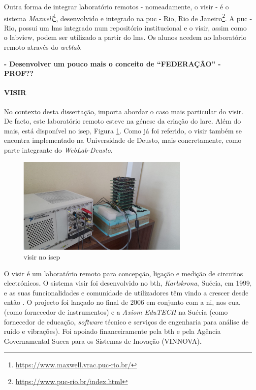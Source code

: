 Outra forma de integrar \acrshort{laboratório remoto}s - nomeadamente, o \acrshort{visir} - é o sistema \textit{Maxwell}\footnote{\url{https://www.maxwell.vrac.puc-rio.br/}}, desenvolvido e integrado na \acrfull{puc} - Rio, Rio de Janeiro\footnote{\url{https://www.puc-rio.br/index.html}}. A \acrshort{puc} - Rio, possui um \acrshort{lms} integrado num repositório institucional e o \acrshort{visir}, assim como o \acrshort{labview}, podem ser utilizado a partir do \acrshort{lms}. Os alunos acedem ao \acrshort{laboratório remoto} através do \textit{weblab}\cite{Alves}.

\textbf{- Desenvolver um pouco mais o conceito de ``FEDERAÇÃO'' - PROF??}

\paragraph{VISIR}
\label{sec:visir}
No contexto desta dissertação, importa abordar o caso mais particular do \acrshort{visir}. De facto, este \acrshort{laboratório remoto} esteve na génese da criação do \acrshort{lare}. Além do mais, está disponível no \acrshort{isep}, Figura \ref{fig:visirISEP}. Como já foi referido, o \acrshort{visir} também se encontra implementado na Universidade de Deusto, mais concretamente, como parte integrante do \textit{WebLab-Deusto}.

\begin{figure}[hbtp]
    \centering
    \includegraphics[width=0.75\textwidth]{figures/visirISEP.jpeg}
    \caption{\acrshort{visir} no \acrshort{isep}}
    \label{fig:visirISEP}
\end{figure}

O \acrshort{visir} é um \acrshort{laboratório remoto} para concepção, ligação e medição de circuitos electrónicos. O sistema \acrshort{visir} foi desenvolvido no \acrfull{bth}, \textit{Karlskrona}, Suécia, em 1999, e as suas funcionalidades e comunidade de utilizadores têm vindo a crescer desde então \cite{RemoteLabsImpactVISIR}. O projecto foi lançado no final de 2006 em conjunto com a \acrshort{ni}, nos \acrshort{eua}, (como fornecedor de instrumentos) e a \textit{Axiom EduTECH} na Suécia (como fornecedor de educação, \textit{software} técnico e serviços de engenharia para análise de ruído e vibrações). Foi apoiado financeiramente pela \acrshort{bth} e pela Agência Governamental Sueca para os Sistemas de Inovação (VINNOVA)\cite{VISIRExperiencesChallenges}.

